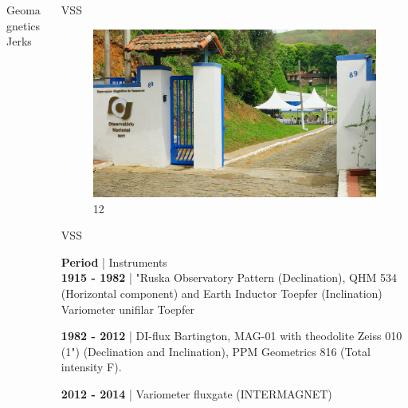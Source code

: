 \documentclass[final,t]{beamer}
\begin{document}
\begin{columns}[t]
\begin{column}{.25\linewidth}
\begin{block}{Geomagnetics Jerks}
		
	\end{block}
\end{column}



\begin{column}{.25\linewidth}



\begin{block}{VSS}
	\justifying
\begin{figure}
\centering
\includegraphics[width=0.9\linewidth]{OMV_JOELSONMOREIRA}
\caption{12}
\label{fig:OMV_JOELSONMOREIRA}
\end{figure}





\end{block}


\begin{block}{VSS}
\justifying

	 \textbf{Period} |\hspace{2.0cm}  Instruments   \\ 
	 
	 \textbf{1915 - 1982} | "Ruska Observatory Pattern (Declination), QHM 534 (Horizontal component) and Earth Inductor Toepfer (Inclination) Variometer unifilar Toepfer 
	 
	 \textbf{1982 - 2012} | DI-flux Bartington, MAG-01 with theodolite Zeiss 010 (1") (Declination and Inclination), PPM Geometrics 816 (Total intensity F).
	 
	 \textbf{2012 - 2014} | Variometer fluxgate (INTERMAGNET)
	
\end{block}



\begin{block}{}
	

\end{block}
\end{column}
\end{columns}
\end{document}

